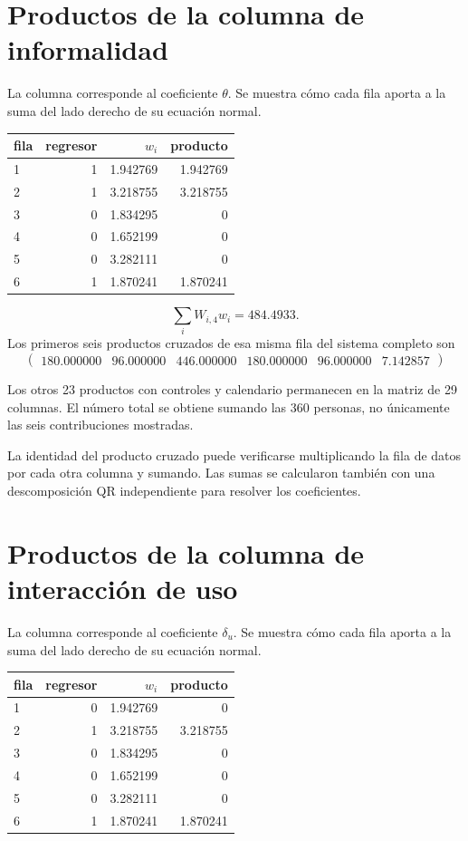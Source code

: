 \documentclass[11pt,a4paper]{article}
\begin{document}
\clearpage
\section{Productos de la columna de informalidad}
La columna corresponde al coeficiente $\theta$. Se muestra cómo cada fila aporta a la suma del lado derecho de su ecuación normal.
\begin{center}\small
\begin{tabular}{lrrr}
\toprule
fila & regresor & $w_i$ & producto\\\midrule
1 & 1 & 1.942769 & 1.942769\\
2 & 1 & 3.218755 & 3.218755\\
3 & 0 & 1.834295 & 0\\
4 & 0 & 1.652199 & 0\\
5 & 0 & 3.282111 & 0\\
6 & 1 & 1.870241 & 1.870241\\
\bottomrule
\end{tabular}\end{center}

\[
\sum_iW_{i,4}w_i=484.4933.
\]
Los primeros seis productos cruzados de esa misma fila del sistema completo son
\[
\begin{pmatrix}180.000000 & 96.000000 & 446.000000 & 180.000000 & 96.000000 & 7.142857\end{pmatrix}
\]

Los otros 23 productos con controles y calendario permanecen en la matriz de 29 columnas. El número total se obtiene sumando las 360 personas, no únicamente las seis contribuciones mostradas.

La identidad del producto cruzado puede verificarse multiplicando la fila de datos por cada otra columna y sumando. Las sumas se calcularon también con una descomposición QR independiente para resolver los coeficientes.

\clearpage
\section{Productos de la columna de interacción de uso}
La columna corresponde al coeficiente $\delta_u$. Se muestra cómo cada fila aporta a la suma del lado derecho de su ecuación normal.
\begin{center}\small
\begin{tabular}{lrrr}
\toprule
fila & regresor & $w_i$ & producto\\\midrule
1 & 0 & 1.942769 & 0\\
2 & 1 & 3.218755 & 3.218755\\
3 & 0 & 1.834295 & 0\\
4 & 0 & 1.652199 & 0\\
5 & 0 & 3.282111 & 0\\
6 & 1 & 1.870241 & 1.870241\\
\bottomrule
\end{tabular}\end{center}
\end{document}
